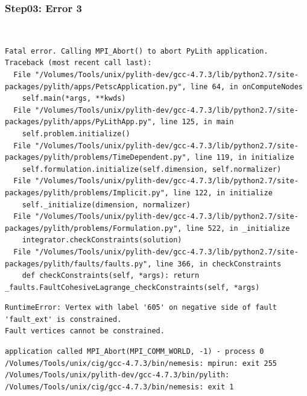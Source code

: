 \documentclass{beamer}
\begin{document}
\begin{frame}[fragile]
  \frametitle{Step03: Error 3}

\\
\begin{lstlisting}
Fatal error. Calling MPI_Abort() to abort PyLith application.
Traceback (most recent call last):
  File "/Volumes/Tools/unix/pylith-dev/gcc-4.7.3/lib/python2.7/site-packages/pylith/apps/PetscApplication.py", line 64, in onComputeNodes
    self.main(*args, **kwds)
  File "/Volumes/Tools/unix/pylith-dev/gcc-4.7.3/lib/python2.7/site-packages/pylith/apps/PyLithApp.py", line 125, in main
    self.problem.initialize()
  File "/Volumes/Tools/unix/pylith-dev/gcc-4.7.3/lib/python2.7/site-packages/pylith/problems/TimeDependent.py", line 119, in initialize
    self.formulation.initialize(self.dimension, self.normalizer)
  File "/Volumes/Tools/unix/pylith-dev/gcc-4.7.3/lib/python2.7/site-packages/pylith/problems/Implicit.py", line 122, in initialize
    self._initialize(dimension, normalizer)
  File "/Volumes/Tools/unix/pylith-dev/gcc-4.7.3/lib/python2.7/site-packages/pylith/problems/Formulation.py", line 522, in _initialize
    integrator.checkConstraints(solution)
  File "/Volumes/Tools/unix/pylith-dev/gcc-4.7.3/lib/python2.7/site-packages/pylith/faults/faults.py", line 366, in checkConstraints
    def checkConstraints(self, *args): return _faults.FaultCohesiveLagrange_checkConstraints(self, *args)
\end{lstlisting}
\begin{lstlisting}
RuntimeError: Vertex with label '605' on negative side of fault 'fault_ext' is constrained.
Fault vertices cannot be constrained.
\end{lstlisting}
\begin{lstlisting}
application called MPI_Abort(MPI_COMM_WORLD, -1) - process 0
/Volumes/Tools/unix/cig/gcc-4.7.3/bin/nemesis: mpirun: exit 255
/Volumes/Tools/unix/pylith-dev/gcc-4.7.3/bin/pylith:
/Volumes/Tools/unix/cig/gcc-4.7.3/bin/nemesis: exit 1
\end{lstlisting}

\end{frame}
\end{document}

